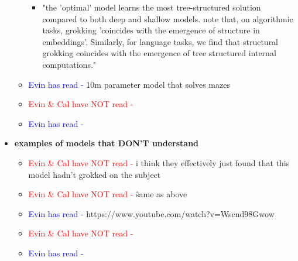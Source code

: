 \documentclass{article}
\begin{document}
\begin{itemize}
\begin{itemize}
\begin{itemize}
            \item "the 'optimal' model learns the most tree-structured solution compared to both deep and shallow models. \cite{liu2022omnigrok} note that, on algorithmic tasks, grokking 'coincides with the emergence of structure in embeddings'. Similarly, for language tasks, we find that structural grokking coincides with the emergence of tree structured internal computations."
        \end{itemize}
        \item \textcolor{blue}{Evin has read -} \cite{ivanitskiy2023structured} 10m parameter model that solves mazes
        \item \textcolor{red}{Evin \& Cal have NOT read - }
        \item \textcolor{blue}{Evin has read -}
    \end{itemize}

    \item \textbf{examples of models that DON'T understand}
    \begin{itemize}
        \item \textcolor{red}{Evin \& Cal have NOT read - } \cite{abdou2021can} i think they effectively just found that this model hadn't grokked on the subject 
        \item \textcolor{red}{Evin \& Cal have NOT read - } \cite{cohn2023evaluation} \^ same as above
        \item \textcolor{blue}{Evin has read -} \cite{berglund2023reversal} https://www.youtube.com/watch?v=Wscnd98Gwow
        \item \textcolor{red}{Evin \& Cal have NOT read - }
        \item \textcolor{blue}{Evin has read -}
    \end{itemize}


\end{itemize}
\end{document}
